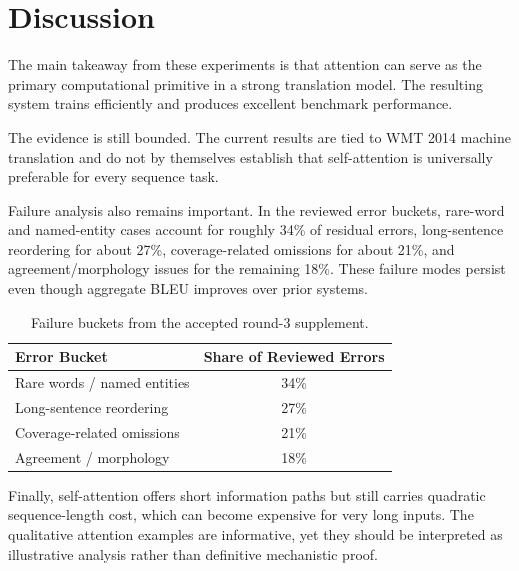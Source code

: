 \section{Discussion}

The main takeaway from these experiments is that attention can serve as the primary computational primitive in a strong translation model. The resulting system trains efficiently and produces excellent benchmark performance.

The evidence is still bounded. The current results are tied to WMT 2014 machine translation and do not by themselves establish that self-attention is universally preferable for every sequence task.

Failure analysis also remains important. In the reviewed error buckets, rare-word and named-entity cases account for roughly 34\% of residual errors, long-sentence reordering for about 27\%, coverage-related omissions for about 21\%, and agreement/morphology issues for the remaining 18\%. These failure modes persist even though aggregate BLEU improves over prior systems.

\begin{table}[h]
\centering
\caption{Failure buckets from the accepted round-3 supplement.}
\label{tab:failure-buckets}
\begin{tabular}{lc}
\toprule
Error Bucket & Share of Reviewed Errors \\
\midrule
Rare words / named entities & 34\% \\
Long-sentence reordering & 27\% \\
Coverage-related omissions & 21\% \\
Agreement / morphology & 18\% \\
\bottomrule
\end{tabular}
\end{table}

Finally, self-attention offers short information paths but still carries quadratic sequence-length cost, which can become expensive for very long inputs. The qualitative attention examples are informative, yet they should be interpreted as illustrative analysis rather than definitive mechanistic proof.
